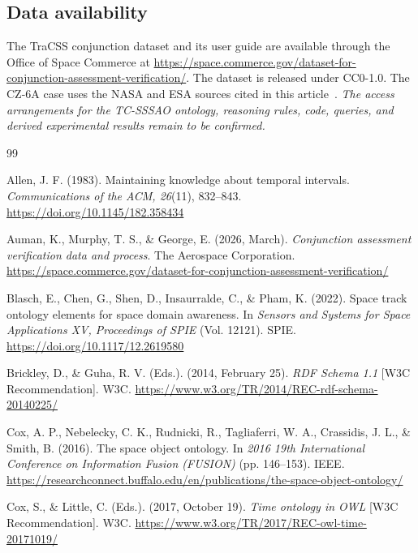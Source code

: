 \documentclass[Royal,sageh,times]{sagej}
\begin{document}
\subsection*{Data availability}
The TraCSS conjunction dataset and its user guide are available through the Office of Space Commerce at \url{https://space.commerce.gov/dataset-for-conjunction-assessment-verification/}. The dataset is released under CC0-1.0. The CZ-6A case uses the NASA and ESA sources cited in this article~\citep{nasa_odqn,wacker2025cz6a}.
\textit{The access arrangements for the TC-SSSAO ontology, reasoning rules, code, queries, and derived experimental results remain to be confirmed.}
\begin{thebibliography}{99}

Allen, J. F. (1983). Maintaining knowledge about temporal intervals. \textit{Communications of the ACM, 26}(11), 832--843. \url{https://doi.org/10.1145/182.358434}

Auman, K., Murphy, T. S., \& George, E. (2026, March). \textit{Conjunction assessment verification data and process}. The Aerospace Corporation. \url{https://space.commerce.gov/dataset-for-conjunction-assessment-verification/}

Blasch, E., Chen, G., Shen, D., Insaurralde, C., \& Pham, K. (2022). Space track ontology elements for space domain awareness. In \textit{Sensors and Systems for Space Applications XV, Proceedings of SPIE} (Vol. 12121). SPIE. \url{https://doi.org/10.1117/12.2619580}

Brickley, D., \& Guha, R. V. (Eds.). (2014, February 25). \textit{RDF Schema 1.1} [W3C Recommendation]. W3C. \url{https://www.w3.org/TR/2014/REC-rdf-schema-20140225/}

Cox, A. P., Nebelecky, C. K., Rudnicki, R., Tagliaferri, W. A., Crassidis, J. L., \& Smith, B. (2016). The space object ontology. In \textit{2016 19th International Conference on Information Fusion (FUSION)} (pp. 146--153). IEEE. \url{https://researchconnect.buffalo.edu/en/publications/the-space-object-ontology/}

Cox, S., \& Little, C. (Eds.). (2017, October 19). \textit{Time ontology in OWL} [W3C Recommendation]. W3C. \url{https://www.w3.org/TR/2017/REC-owl-time-20171019/}


\end{thebibliography}
\end{document}
